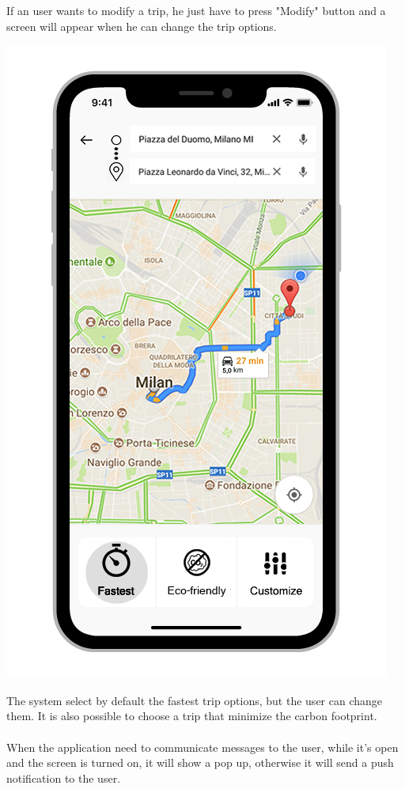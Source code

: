 If an user wants to modify a trip, he just have to press "Modify" button and a screen will appear when he can change the trip options.
\begin{center}
\includegraphics[scale=2.4]{MainMatter/images/ui/journeychoose}
\end{center}
The system select by default the fastest trip options, but the user can change them. It is also possible to choose a trip that minimize the carbon footprint.
\\
\\
When the application need to communicate messages to the user, while it’s open and the screen is turned on, it will show a pop up, otherwise it will send a push notification to the user.
%
